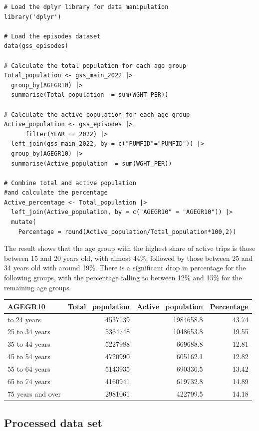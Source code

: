 \documentclass[Royal,times,sageh]{sagej}
\begin{document}
\begin{verbatim}
# Load the dplyr library for data manipulation
library('dplyr')

# Load the episodes dataset
data(gss_episodes) 

# Calculate the total population for each age group
Total_population <- gss_main_2022 |> 
  group_by(AGEGR10) |> 
  summarise(Total_population  = sum(WGHT_PER))

# Calculate the active population for each age group
Active_population <- gss_episodes |> 
      filter(YEAR == 2022) |> 
  left_join(gss_main_2022, by = c("PUMFID"="PUMFID")) |> 
  group_by(AGEGR10) |> 
  summarise(Active_population  = sum(WGHT_PER))

# Combine total and active population 
#and calculate the percentage
Active_percentage <- Total_population |> 
  left_join(Active_population, by = c("AGEGR10" = "AGEGR10")) |>
  mutate(
    Percentage = round(Active_population/Total_population*100,2))
\end{verbatim}

The result shows that the age group with the highest share of active
trips is those between 15 and 20 years old, with almost 44\%, followed
by those between 25 and 34 years old with around 19\%. There is a
significant drop in percentage for the following groups, with the
percentage falling to between 12\% and 15\% for the remaining age
groups.

\begin{longtable}[]{@{}lrrr@{}}
\toprule\noalign{}
AGEGR10 & Total\_population & Active\_population & Percentage \\
\midrule\noalign{}
\endhead
\bottomrule\noalign{}
\endlastfoot
15 to 24 years & 4537139 & 1984658.8 & 43.74 \\
25 to 34 years & 5364748 & 1048653.8 & 19.55 \\
35 to 44 years & 5227988 & 669688.8 & 12.81 \\
45 to 54 years & 4720990 & 605162.1 & 12.82 \\
55 to 64 years & 5143935 & 690336.5 & 13.42 \\
65 to 74 years & 4160941 & 619732.8 & 14.89 \\
75 years and over & 2981061 & 422799.5 & 14.18 \\
\end{longtable}

\subsection{Processed data set}\label{processed-data-set}
\end{document}
